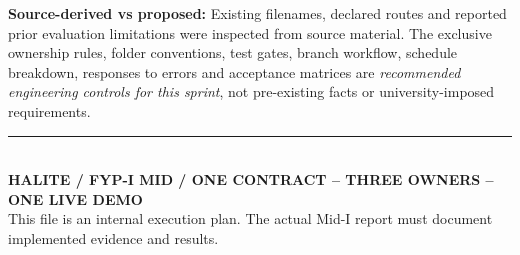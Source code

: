 \documentclass[11pt,a4paper,oneside]{report}
\begin{document}
\textbf{Source-derived vs proposed:} Existing filenames, declared routes and reported prior evaluation limitations were inspected from source material. The exclusive ownership rules, folder conventions, test gates, branch workflow, schedule breakdown, responses to errors and acceptance matrices are \emph{recommended engineering controls for this sprint}, not pre-existing facts or university-imposed requirements.

\vfill
\begin{center}\textcolor{rulec}{\rule{.9\textwidth}{.6pt}}\\
{\sffamily\bfseries HALITE / FYP-I MID / ONE CONTRACT -- THREE OWNERS -- ONE LIVE DEMO}\\
{\small This file is an internal execution plan. The actual Mid-I report must document implemented evidence and results.}
\end{center}
\end{document}

